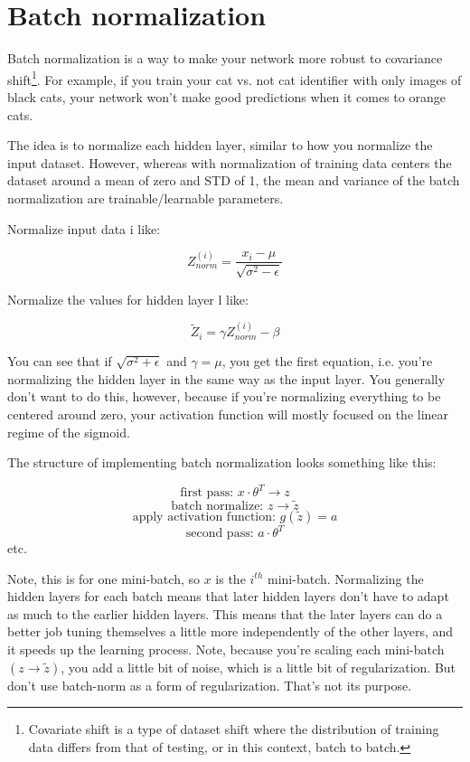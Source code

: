 \section{Batch normalization}

Batch normalization is a way to make your network more robust to covariance shift\footnote{Covariate shift is a type of dataset shift where the distribution of training data differs from that of testing, or in this context, batch to batch.}. For example, if you train your cat vs. not cat identifier with only images of black cats, your network won't make good predictions when it comes to orange cats.

The idea is to normalize each hidden layer, similar to how you normalize the input dataset. However, whereas with normalization of training data centers the dataset around a mean of zero and STD of 1, the mean and variance of the batch normalization are trainable/learnable parameters.

Normalize input data i like:


\begin{equation}
    Z_{norm}^{(i)} = \frac{x_i-\mu}{\sqrt{\sigma^2-\epsilon}}
\end{equation}


Normalize the values for hidden layer l like:

\begin{equation}
\widetilde{Z}_i = \gamma Z_{norm}^{(i)} - \beta
\end{equation}

You can see that if $\sqrt{\sigma^2 + \epsilon}$ and $\gamma = \mu$, you get the first equation, i.e. you're normalizing the hidden layer in the same way as the input layer. You generally don't want to do this, however, because if you're normalizing everything to be centered around zero, your activation function will mostly focused on the linear regime of the sigmoid.

The structure of implementing batch normalization looks something like this:

$$\text{first pass: } x \cdot \theta^T \rightarrow z$$
$$\text{batch normalize: } z \rightarrow \widetilde{z}$$ 
$$\text{apply activation function: } g(\widetilde{z}) = a$$
$$\text{second pass: } a \cdot \theta^T$$     
etc.

Note, this is for one mini-batch, so $x$ is the $i^{th}$ mini-batch. Normalizing the hidden layers for each batch means that later hidden layers don't have to adapt as much to the earlier hidden layers. This means that the later layers can do a better job tuning themselves a little more independently of the other layers, and it speeds up the learning process. Note, because you're scaling each mini-batch $(z \rightarrow \widetilde{z})$, you add a little bit of noise, which is a little bit of regularization. But don't use batch-norm as a form of regularization. That's not its purpose.

